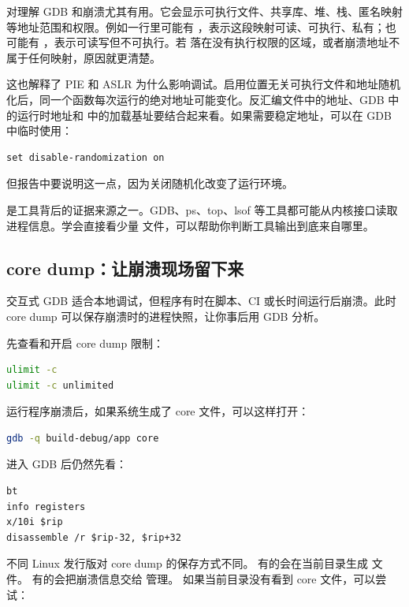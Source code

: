  对理解 GDB 和崩溃尤其有用。它会显示可执行文件、共享库、堆、栈、匿名映射等地址范围和权限。例如一行里可能有 ，表示这段映射可读、可执行、私有；也可能有 ，表示可读写但不可执行。若  落在没有执行权限的区域，或者崩溃地址不属于任何映射，原因就更清楚。

这也解释了 PIE 和 ASLR 为什么影响调试。启用位置无关可执行文件和地址随机化后，同一个函数每次运行的绝对地址可能变化。反汇编文件中的地址、GDB 中的运行时地址和  中的加载基址要结合起来看。如果需要稳定地址，可以在 GDB 中临时使用：

\begin{lstlisting}
set disable-randomization on
\end{lstlisting}

但报告中要说明这一点，因为关闭随机化改变了运行环境。

\begin{deepdive}
 是工具背后的证据来源之一。GDB、ps、top、lsof 等工具都可能从内核接口读取进程信息。学会直接看少量  文件，可以帮助你判断工具输出到底来自哪里。
\end{deepdive}

\subsection{core dump：让崩溃现场留下来}

交互式 GDB 适合本地调试，但程序有时在脚本、CI 或长时间运行后崩溃。此时 core dump 可以保存崩溃时的进程快照，让你事后用 GDB 分析。

先查看和开启 core dump 限制：

\begin{lstlisting}[language=bash]
ulimit -c
ulimit -c unlimited
\end{lstlisting}

运行程序崩溃后，如果系统生成了 core 文件，可以这样打开：

\begin{lstlisting}[language=bash]
gdb -q build-debug/app core
\end{lstlisting}

进入 GDB 后仍然先看：

\begin{lstlisting}
bt
info registers
x/10i $rip
disassemble /r $rip-32, $rip+32
\end{lstlisting}

不同 Linux 发行版对 core dump 的保存方式不同。
有的会在当前目录生成  文件。
有的会把崩溃信息交给  管理。
如果当前目录没有看到 core 文件，可以尝试：

